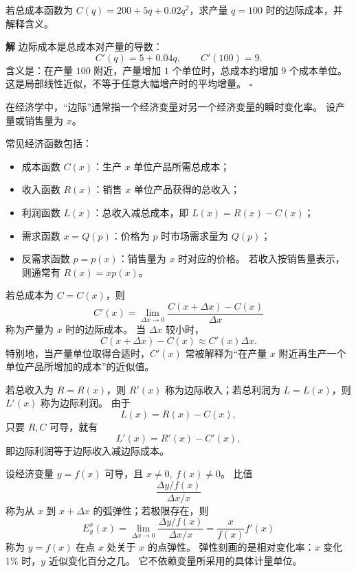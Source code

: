 \documentclass[fontset=fandol]{ctexart}
\newenvironment{solution}{\par\noindent\textbf{解}\quad}{\hfill$\square$\par\vspace{0.8em}}
\begin{document}
\begin{example}[边际成本]
若总成本函数为 $C(q)=200+5q+0.02q^2$，求产量 $q=100$ 时的边际成本，并解释含义。
\end{example}
\begin{solution}
边际成本是总成本对产量的导数：
\[
C'(q)=5+0.04q,\qquad C'(100)=9.
\]
含义是：在产量 $100$ 附近，产量增加 $1$ 个单位时，总成本约增加 $9$ 个成本单位。 这是局部线性近似，不等于任意大幅增产时的平均增量。
\end{solution}

\begin{definition}[边际函数]
在经济学中，“边际”通常指一个经济变量对另一个经济变量的瞬时变化率。 设产量或销售量为 $x$。

常见经济函数包括：
\begin{itemize}[leftmargin=2em]
\item 成本函数 $C(x)$：生产 $x$ 单位产品所需总成本；
\item 收入函数 $R(x)$：销售 $x$ 单位产品获得的总收入；
\item 利润函数 $L(x)$：总收入减总成本，即 $L(x)=R(x)-C(x)$；
\item 需求函数 $x=Q(p)$：价格为 $p$ 时市场需求量为 $Q(p)$；
\item 反需求函数 $p=p(x)$：销售量为 $x$ 时对应的价格。 若收入按销售量表示，则通常有 $R(x)=xp(x)$。
\end{itemize}

若总成本为 $C=C(x)$，则
\[
C'(x)=\lim_{\Delta x\to0}\frac{C(x+\Delta x)-C(x)}{\Delta x}
\]
称为产量为 $x$ 时的边际成本。 当 $\Delta x$ 较小时，
\[
C(x+\Delta x)-C(x)\approx C'(x)\Delta x.
\]
特别地，当产量单位取得合适时，$C'(x)$ 常被解释为“在产量 $x$ 附近再生产一个单位产品所增加的成本”的近似值。

若总收入为 $R=R(x)$，则 $R'(x)$ 称为边际收入；若总利润为 $L=L(x)$，则 $L'(x)$ 称为边际利润。 由于
\[
L(x)=R(x)-C(x),
\]
只要 $R,C$ 可导，就有
\[
L'(x)=R'(x)-C'(x),
\]
即边际利润等于边际收入减边际成本。
\end{definition}

\begin{definition}[弹性]
设经济变量 $y=f(x)$ 可导，且 $x\neq0,\ f(x)\neq0$。 比值
\[
\frac{\Delta y/f(x)}{\Delta x/x}
\]
称为从 $x$ 到 $x+\Delta x$ 的弧弹性；若极限存在，则
\[
E_y^x(x)=\lim_{\Delta x\to0}\frac{\Delta y/f(x)}{\Delta x/x}
=\frac{x}{f(x)}f'(x)
\]
称为 $y=f(x)$ 在点 $x$ 处关于 $x$ 的点弹性。 弹性刻画的是相对变化率：$x$ 变化 $1\%$ 时，$y$ 近似变化百分之几。 它不依赖变量所采用的具体计量单位。
\end{definition}
\end{document}
